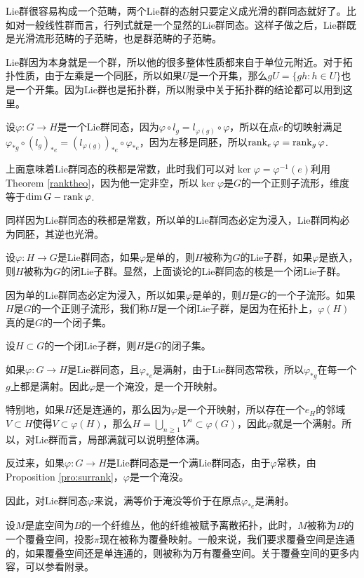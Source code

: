 Lie群很容易构成一个范畴，两个Lie群的态射只要定义成光滑的群同态就好了。比如对一般线性群而言，行列式就是一个显然的Lie群同态。这样子做之后，Lie群既是光滑流形范畴的子范畴，也是群范畴的子范畴。

Lie群因为本身就是一个群，所以他的很多整体性质都来自于单位元附近。对于拓扑性质，由于左乘是一个同胚，所以如果$U$是一个开集，那么$gU=\{gh:h\in U\}$也是一个开集。因为Lie群也是拓扑群，所以附录中关于拓扑群的结论都可以用到这里。

\para 设$\varphi:G\to H$是一个Lie群同态，因为$\varphi\circ l_g=l_{\varphi(g)}\circ \varphi$，所以在点$e$的切映射满足$\varphi_{*g}\circ (l_g)_{*e}=(l_{\varphi(g)})_{*e}\circ \varphi_{*e}$，因为左移是同胚，所以$\operatorname{rank}_e \varphi=\operatorname{rank}_g \varphi$.

上面意味着Lie群同态的秩都是常数，此时我们可以对$\ker \varphi=\varphi^{-1}(e)$利用Theorem \ref{ranktheo}，因为他一定非空，所以$\ker \varphi$是$G$的一个正则子流形，维度等于$\dim G-\operatorname{rank} \varphi$.

同样因为Lie群同态的秩都是常数，所以单的Lie群同态必定为浸入，Lie群同构必为同胚，其逆也光滑。

\para 设$\varphi:H\to G$是Lie群同态，如果$\varphi$是单的，则$H$被称为$G$的Lie子群，如果$\varphi$是嵌入，则$H$被称为$G$的闭Lie子群。显然，上面谈论的Lie群同态的核是一个闭Lie子群。

因为单的Lie群同态必定为浸入，所以如果$\varphi$是单的，则$H$是$G$的一个子流形。如果$H$是$G$的一个正则子流形，我们称$H$是一个闭Lie子群，是因为在拓扑上，$\varphi(H)$真的是$G$的一个闭子集。

\pro 设$H\subset G$的一个闭Lie子群，则$H$是$G$的闭子集。

\para 如果$\varphi:G\to H$是Lie群同态，且$\varphi_{*e}$是满射，由于Lie群同态常秩，所以$\varphi_{*g}$在每一个$g$上都是满射。因此$\varphi$是一个淹没，是一个开映射。

特别地，如果$H$还是连通的，那么因为$\varphi$是一个开映射，所以存在一个$e_H$的邻域$V\subset H$使得$V\subset \varphi(H)$，那么$H=\bigcup_{n\geq 1}V^n\subset \varphi(G)$，因此$\varphi$就是一个满射。所以，对Lie群而言，局部满就可以说明整体满。

反过来，如果$\varphi:G\to H$是Lie群同态是一个满Lie群同态，由于$\varphi$常秩，由Proposition \eqref{pro:surrank}，$\varphi$是一个淹没。

因此，对Lie群同态$\varphi$来说，满等价于淹没等价于在原点$\varphi_{*e}$是满射。

\para \label{covering_space}设$M$是底空间为$B$的一个纤维丛，他的纤维被赋予离散拓扑，此时，$M$被称为$B$的一个覆叠空间，投影$\pi$现在被称为覆叠映射。一般来说，我们要求覆叠空间是连通的，如果覆叠空间还是单连通的，则被称为万有覆叠空间。关于覆叠空间的更多内容，可以参看附录。

